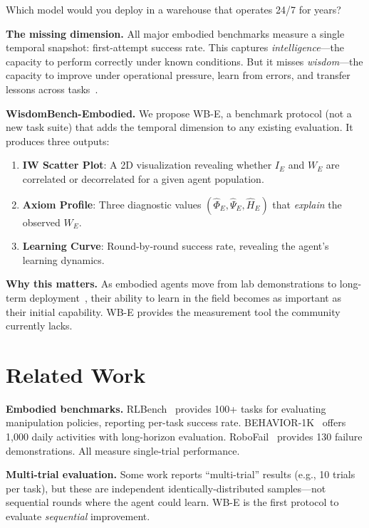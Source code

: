 \documentclass{article}
\begin{document}
Which model would you deploy in a warehouse that operates 24/7 for years?

\textbf{The missing dimension.}
All major embodied benchmarks measure a single temporal snapshot: first-attempt success rate.
This captures \emph{intelligence}---the capacity to perform correctly under known conditions.
But it misses \emph{wisdom}---the capacity to improve under operational pressure, learn from errors, and transfer lessons across tasks~\citep{sovereign2026p3, sovereign2026p4}.

\textbf{WisdomBench-Embodied.}
We propose WB-E, a benchmark protocol (not a new task suite) that adds the temporal dimension to any existing evaluation.
It produces three outputs:

\begin{enumerate}[leftmargin=*,itemsep=2pt]
    \item \textbf{IW Scatter Plot}: A 2D visualization revealing whether $I_E$ and $W_E$ are correlated or decorrelated for a given agent population.
    \item \textbf{Axiom Profile}: Three diagnostic values $(\hat{\Phi}_E, \hat{\Psi}_E, \hat{H}_E)$ that \emph{explain} the observed $W_E$.
    \item \textbf{Learning Curve}: Round-by-round success rate, revealing the agent's learning dynamics.
\end{enumerate}

\textbf{Why this matters.}
As embodied agents move from lab demonstrations to long-term deployment~\citep{fleet2025}, their ability to learn in the field becomes as important as their initial capability.
WB-E provides the measurement tool the community currently lacks.

\section{Related Work}
\label{sec:related}

\textbf{Embodied benchmarks.}
RLBench~\citep{james2020rlbench} provides 100+ tasks for evaluating manipulation policies, reporting per-task success rate.
BEHAVIOR-1K~\citep{li2023behavior} offers 1{,}000 daily activities with long-horizon evaluation.
RoboFail~\citep{liu2023reflect} provides 130 failure demonstrations.
All measure single-trial performance.

\textbf{Multi-trial evaluation.}
Some work reports ``multi-trial'' results (e.g., 10 trials per task), but these are independent identically-distributed samples---not sequential rounds where the agent could learn.
WB-E is the first protocol to evaluate \emph{sequential} improvement.
\end{document}
